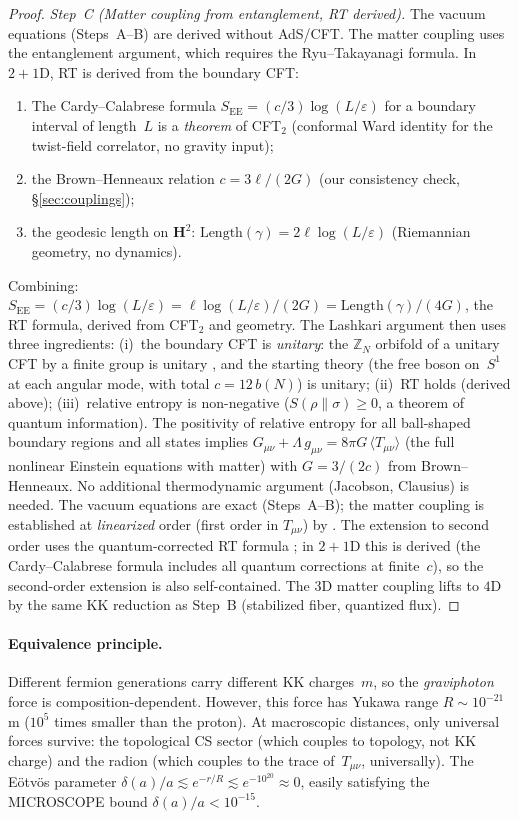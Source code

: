 \begin{proof}
\emph{Step~C (Matter coupling from entanglement, RT derived).}
The vacuum equations (Steps~A--B) are derived without AdS/CFT.
The matter coupling uses the
\citet{Lashkari2014} entanglement argument, which requires
the Ryu--Takayanagi formula.
In $2{+}1$D, RT is derived from the boundary CFT:
\begin{enumerate}
\item The Cardy--Calabrese formula
  $S_{\mathrm{EE}} = (c/3)\log(L/\varepsilon)$
  for a boundary interval of length~$L$ is a
  \emph{theorem} of CFT$_2$ (conformal Ward identity
  for the twist-field correlator, no gravity input);
\item the Brown--Henneaux relation $c = 3\ell/(2G)$
  (our consistency check, \S\ref{sec:couplings});
\item the geodesic length on $\mathbf{H}^2$:
  $\mathrm{Length}(\gamma) = 2\ell\log(L/\varepsilon)$
  (Riemannian geometry, no dynamics).
\end{enumerate}
Combining: $S_{\mathrm{EE}} = (c/3)\log(L/\varepsilon)
= \ell\log(L/\varepsilon)/(2G)
= \mathrm{Length}(\gamma)/(4G)$, the RT formula, derived from CFT$_2$ and geometry.
The Lashkari argument then uses three ingredients:
(i)~the boundary CFT is \emph{unitary}:
the $\mathbb{Z}_N$ orbifold of a unitary CFT
by a finite group is unitary
\citep{DixonHarveyVafaWitten1985}, and the
starting theory (the free boson on~$S^1$ at each
angular mode, with total $c = 12\,b(N)$) is unitary;
(ii)~RT holds (derived above);
(iii)~relative entropy is non-negative
($S(\rho\|\sigma) \ge 0$, a theorem of quantum information).
The positivity of relative entropy for all ball-shaped boundary
regions and all states implies
$G_{\mu\nu} + \Lambda\,g_{\mu\nu} = 8\pi G\,\langle T_{\mu\nu}\rangle$
 (the full nonlinear Einstein equations with matter) with
$G = 3/(2c)$ from Brown--Henneaux.
No additional thermodynamic argument (Jacobson, Clausius) is needed.
The vacuum equations are exact (Steps~A--B); the matter coupling
is established at \emph{linearized} order (first order in $T_{\mu\nu}$)
by \citet{Lashkari2014}.
The extension to second order uses the quantum-corrected
RT formula \citep{Faulkner2017}; in $2{+}1$D this is derived
(the Cardy--Calabrese formula includes all quantum corrections
at finite~$c$), so the second-order extension is also
self-contained.
The $3$D matter coupling lifts to $4$D by the same
KK reduction as Step~B (stabilized fiber, quantized flux).
\end{proof}

\paragraph{Equivalence principle.}
Different fermion generations carry different KK charges~$m$,
so the \emph{graviphoton} force is composition-dependent.
However, this force has Yukawa range $R \sim 10^{-21}$\,m
($10^5$ times smaller than the proton).
At macroscopic distances, only universal forces survive:
the topological CS sector (which couples to topology, not KK charge)
and the radion (which couples to the trace of~$T_{\mu\nu}$, universally).
The E\"otv\"os parameter
$\delta(a)/a \lesssim e^{-r/R} \lesssim e^{-10^{20}} \approx 0$,
easily satisfying the MICROSCOPE bound $\delta(a)/a < 10^{-15}$.

